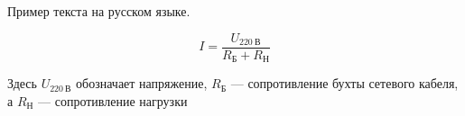 \documentclass{article}
\begin{document}
Пример текста на русском языке.


\begin{equation}
  \label{ohm_law}
  I = \frac{U_{220~\text{В}}}{R_\text{Б} + R_\text{Н}}
\end{equation}

Здесь $U_{220~\text{В}}$ обозначает напряжение, $R_\text{Б}$ — сопротивление бухты сетевого кабеля, а $R_\text{Н}$ — сопротивление нагрузки
\end{document}
